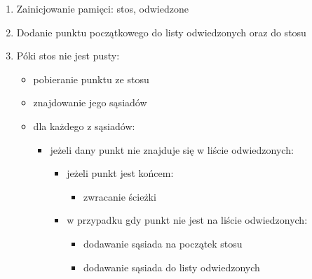\documentclass{article}
\begin{document}
\begin{enumerate}
\item Zainicjowanie pamięci: stos, odwiedzone
\item Dodanie punktu początkowego do listy odwiedzonych oraz do stosu
\item Póki stos nie jest pusty:
	\begin{itemize}
	\item pobieranie punktu ze stosu
	\item znajdowanie jego sąsiadów
	\item dla każdego z sąsiadów:
	\begin{itemize}
		\item jeżeli dany punkt nie znajduje się w liście odwiedzonych:
			\begin{itemize}
			\item jeżeli punkt jest końcem:
				\begin{itemize}
				\item zwracanie ścieżki
				\end{itemize}
			\item w przypadku gdy punkt nie jest na liście odwiedzonych:
				\begin{itemize}
				\item dodawanie sąsiada na początek stosu
				\item dodawanie sąsiada do listy odwiedzonych				
				\end{itemize}
			\end{itemize}
		\end{itemize}		
	\end{itemize}
\end{enumerate}
\end{document}
